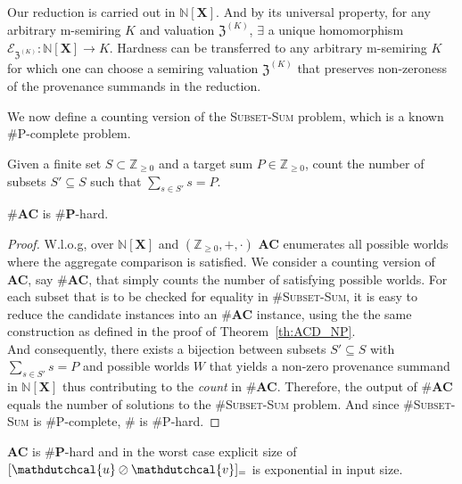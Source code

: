 \begin{remark}[On generality]
Our reduction is carried out in $\mathbb{N}[\mathbf{X}]$. And by its universal property, for any arbitrary m-semiring $K$ 
  and valuation $\mathfrak{Z}^{(K)}$, $\exists$ a unique homomorphism $\mathcal{E}_{\mathfrak{Z}^{(K)}}:\mathbb{N}[\mathbf{X}]\rightarrow K$. Hardness can be transferred 
  to any arbitrary m-semiring $K$ for which one can choose a semiring valuation $\mathfrak{Z}^{(K)}$ that preserves non-zeroness of the provenance summands in the reduction.
\end{remark}
We now define a counting version of the \textsc{Subset-Sum} problem, which is a known \#P-complete problem.
\begin{definition}
  Given a finite set $S\subset\mathbb{Z}_{\geq 0}$ and a target sum $P\in\mathbb{Z}_{\geq 0}$, count the number of subsets $S'\subseteq S$ such that $\sum_{s\in S'}s = P$.
\end{definition}
\begin{theorem}
  \#\textbf{AC} is $\#$\textbf{P}-hard.
\end{theorem}
\begin{proof}
  W.l.o.g, over $\mathbb{N}[\mathbf{X}]$ and $(\mathbb{Z}_{\geq 0},+,\cdot)$ \textbf{AC} enumerates all possible worlds where the aggregate comparison is satisfied. 
  We consider a counting version of \textbf{AC}, say \#\textbf{AC}, that simply counts the number of satisfying possible worlds.
  For each subset that is to be checked for equality in \#\textsc{Subset-Sum}, it is easy to reduce the candidate instances into an \#\textbf{AC} instance, 
  using the the same construction as defined in the proof of Theorem~\ref{th:ACD_NP}.\\
  And consequently, there exists a bijection between subsets $S'\subseteq S$ with $\sum_{s\in S'} s =P$ and possible worlds $W$ that yields a non-zero provenance summand in $\mathbb{N}[\textbf{X}]$ thus contributing to the \textit{count} in \#\textbf{AC}. 
  Therefore, the output of \#\textbf{AC} equals the number of solutions to the \#\textsc{Subset-Sum} problem. And since  \#\textsc{Subset-Sum} is \#P-complete, \# is \#P-hard. 
\end{proof}
\begin{corollary}
  \textbf{AC} is $\#$\textbf{P}-hard and in the worst case explicit size of $[\mathdutchcal{u}\oslash\mathdutchcal{v}]_=$ is exponential in input size.
\end{corollary}

